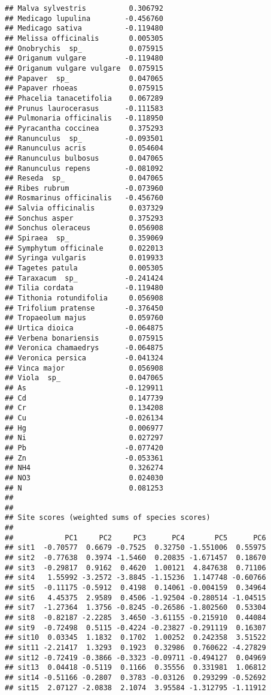 \documentclass[
]{article}
\begin{document}
\begin{verbatim}
## Malva sylvestris          0.306792
## Medicago lupulina        -0.456760
## Medicago sativa          -0.119480
## Melissa officinalis       0.005305
## Onobrychis  sp_           0.075915
## Origanum vulgare         -0.119480
## Origanum vulgare vulgare  0.075915
## Papaver  sp_              0.047065
## Papaver rhoeas            0.075915
## Phacelia tanacetifolia    0.067289
## Prunus laurocerasus      -0.111583
## Pulmonaria officinalis   -0.118950
## Pyracantha coccinea       0.375293
## Ranunculus  sp_          -0.093501
## Ranunculus acris          0.054604
## Ranunculus bulbosus       0.047065
## Ranunculus repens        -0.081092
## Reseda  sp_               0.047065
## Ribes rubrum             -0.073960
## Rosmarinus officinalis   -0.456760
## Salvia officinalis        0.037329
## Sonchus asper             0.375293
## Sonchus oleraceus         0.056908
## Spiraea  sp_              0.359069
## Symphytum officinale      0.022013
## Syringa vulgaris          0.019933
## Tagetes patula            0.005305
## Taraxacum  sp_           -0.241424
## Tilia cordata            -0.119480
## Tithonia rotundifolia     0.056908
## Trifolium pratense       -0.376450
## Tropaeolum majus          0.059760
## Urtica dioica            -0.064875
## Verbena bonariensis       0.075915
## Veronica chamaedrys      -0.064875
## Veronica persica         -0.041324
## Vinca major               0.056908
## Viola  sp_                0.047065
## As                       -0.129911
## Cd                        0.147739
## Cr                        0.134208
## Cu                       -0.026134
## Hg                        0.006977
## Ni                        0.027297
## Pb                       -0.077420
## Zn                       -0.053361
## NH4                       0.326274
## NO3                       0.024030
## N                         0.081253
## 
## 
## Site scores (weighted sums of species scores)
## 
##            PC1     PC2     PC3      PC4       PC5      PC6
## sit1  -0.70577  0.6679 -0.7525  0.32750 -1.551006  0.55975
## sit2  -0.77638  0.3974 -1.5460  0.20835 -1.671457  0.18670
## sit3  -0.29817  0.9162  0.4620  1.00121  4.847638  0.71106
## sit4   1.55992 -3.2572 -3.8845 -1.15236  1.147748 -0.60766
## sit5  -0.11175 -0.5912  0.4198  0.14061 -0.004159  0.34964
## sit6   4.45375  2.9589  0.4506 -1.92504 -0.280514 -1.04515
## sit7  -1.27364  1.3756 -0.8245 -0.26586 -1.802560  0.53304
## sit8  -0.82187 -2.2285  3.4650 -3.61155 -0.215910  0.44084
## sit9  -0.72498  0.5115 -0.4224 -0.23827 -0.291119  0.16307
## sit10  0.03345  1.1832  0.1702  1.00252  0.242358  3.51522
## sit11 -2.21417  1.3293  0.1923  0.32986  0.760622 -4.27829
## sit12 -0.72419 -0.3866 -0.3323 -0.09711 -0.494127  0.04969
## sit13  0.04418 -0.5119  0.1166  0.35556  0.331981  1.06812
## sit14 -0.51166 -0.2807  0.3783 -0.03126  0.293299 -0.52692
## sit15  2.07127 -2.0838  2.1074  3.95584 -1.312795 -1.11912
\end{verbatim}
\end{document}
